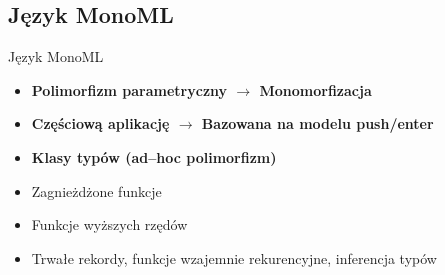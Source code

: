 \documentclass{beamer}
\begin{document}
\subsection{Język MonoML}

\begin{frame}{Język MonoML}
\begin{itemize}
    \pause
    \item \textbf{Polimorfizm parametryczny $\rightarrow$ Monomorfizacja}
    \pause
    \item \textbf{Częściową aplikację $\rightarrow$ Bazowana na modelu
    push/enter}
    \pause
    \item \textbf{Klasy typów (ad--hoc polimorfizm)}
    \pause
    \item Zagnieżdżone funkcje 
    \item Funkcje wyższych rzędów 
    \item Trwałe rekordy, funkcje wzajemnie rekurencyjne, inferencja typów
    
\end{itemize}
\end{frame}
\end{document}
